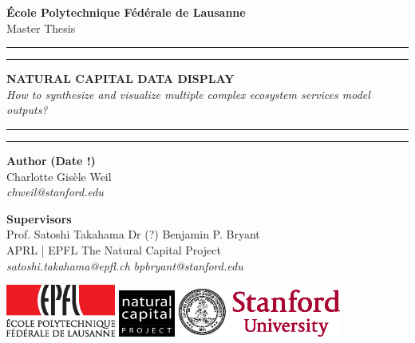 
\begin{titlepage}
\begin{center}
\Large
\textbf{École Polytechnique Fédérale de Lausanne} \\
\vspace{1cm}
Master Thesis
\vspace{2cm}
\hrule
\vspace{0.1cm}
\hrule
\vspace{1cm}
\Huge
\textbf{NATURAL CAPITAL DATA DISPLAY} \\

\Large
\vspace{0.2cm}
\textit{How to synthesize and visualize multiple complex ecosystem services model outputs?} \\

\vspace{1cm}
\hrule
\vspace{0.1cm}
\hrule

\end{center}
\vfill
\noindent \textbf{Author} \hfill \textbf{(Date !)} \\
Charlotte Gisèle Weil \\
\textit{chweil@stanford.edu} \\
\vspace{0.5cm}

\noindent \textbf{Supervisors} \\
Prof. Satoshi Takahama          \hfill    Dr (?) Benjamin P. Bryant \\
APRL | EPFL      \hfill    The Natural Capital Project\\
\textit{satoshi.takahama@epfl.ch} \hfill    \textit{bpbryant@stanford.edu} \\
\vspace{0.8cm}

\noindent

\includegraphics[width=0.27\textwidth]{images/epfl-logo.eps}
\hfill  \hfill \includegraphics[width=0.14\textwidth]{images/natcap-logo.eps} \hfill  \hfill 
\includegraphics[width=0.4\textwidth]{images/stanford-logo.eps}

\end{titlepage}

